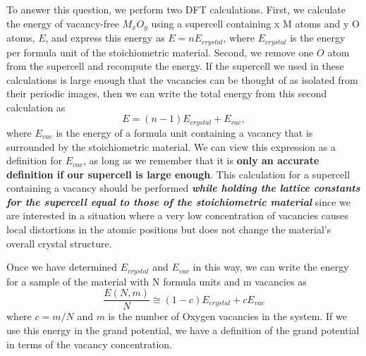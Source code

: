 \documentclass[12pt]{article}
\begin{document}
To answer this question, we perform two DFT calculations. First, we calculate the energy of vacancy-free $M_xO_y$ using a supercell containing x M atoms and y O atoms, $E$, and express this energy as $E = nE_{crystal}$, where $E_{crystal}$ is the energy per formula unit of the stoichiometric material. Second, we remove one $O$ atom from the supercell and recompute the energy. If the supercell we used in these calculations is large enough that the vacancies can be thought of as isolated from their periodic images, then we can write the total energy from this second calculation as 
\begin{equation}
    E = (n-1)E_{crystal} + E_{vac},
\end{equation} 
where $E_{vac}$ is the energy of a formula unit containing a vacancy that is surrounded by the stoichiometric material. We can view this expression as a definition for $E_{vac}$, as long as we remember that it is \textbf{only an accurate definition if our supercell is large enough}. This calculation for a supercell containing a vacancy should be performed \textbf{\textit{while holding the lattice constants for the supercell equal to those of the stoichiometric material}} since we are interested in a situation where a very low concentration of vacancies causes local distortions in the atomic positions but does not change the material’s overall crystal structure.

Once we have determined $E_{crystal}$ and $E_{vac}$ in this way, we can write the energy for a sample of the material with N formula units and m vacancies as
\begin{equation}
    \frac{E(N, m)}{N}\cong(1-c)E_{crystal}+cE_{vac}
\end{equation}
where $c=m/N$ and $m$ is the number of Oxygen vacancies in the system. If we use this energy in the grand potential, we have a definition of the grand potential in terms of the vacancy concentration.
\end{document}
